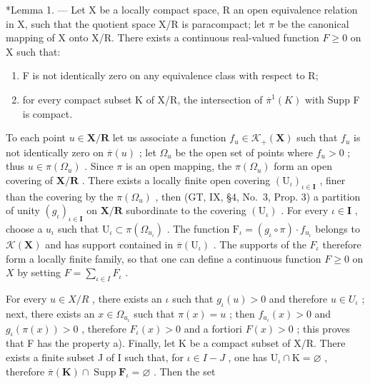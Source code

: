 \appendixheading

*Lemma 1. --- Let X be a locally compact space, R an open equivalence relation in X, such that the quotient space X/R is paracompact; let \(\pi\) be the canonical mapping of X onto X/R. There exists a continuous real-valued function \(F \geqslant 0\) on X such that:

\begin{enumerate}
\def\labelenumi{\alph{enumi})}
\item
  F is not identically zero on any equivalence class with respect to R;
\item
  for every compact subset K of X/R, the intersection of \(\overline{\pi}^{1}(K)\) with Supp F is compact.
\end{enumerate}

To each point \(u \in \mathbf{X} / \mathbf{R}\) let us associate a function \(f_{u} \in \mathcal{K}_{+}(\mathbf{X})\) such that \(f_{u}\) is not identically zero on \(\overline{\pi}(u)\) ; let \(\Omega_{u}\) be the open set of points where \(f_{u} > 0\) ; thus \(u \in \pi(\Omega_{u})\) . Since \(\pi\) is an open mapping, the \(\pi(\Omega_{u})\) form an open covering of \(\mathbf{X} / \mathbf{R}\) . There exists a locally finite open covering \((\mathrm{U}_{\iota})_{\iota \in \mathbf{I}}\) , finer than the covering by the \(\pi(\Omega_{u})\) , then (GT, IX, §4, No.~3, Prop. 3) a partition of unity \((g_{\iota})_{\iota \in \mathbf{I}}\) on \(\mathbf{X} / \mathbf{R}\) subordinate to the covering \((\mathrm{U}_{\iota})\) . For every \(\iota \in \mathbf{I}\) , choose a \(u_{\iota}\) such that \(\mathrm{U}_{\iota} \subset \pi(\Omega_{u_{\iota}})\) . The function \(\mathrm{F}_{\iota} = (g_{\iota} \circ \pi) \cdot f_{u_{\iota}}\) belongs to \(\mathcal{K}(\mathbf{X})\) and has support contained in \(\overline{\pi}(\mathrm{U}_{\iota})\) . The supports of the \(F_{\iota}\) therefore form a locally finite family, so that one can define a continuous function \(F \geqslant 0\) on \(X\) by setting \(F = \sum_{\iota \in I} F_{\iota}\) .

For every \(u \in X/R\) , there exists an \(\iota\) such that \(g_{\iota}(u) > 0\) and therefore \(u \in U_{\iota}\) ; next, there exists an \(x \in \Omega_{u_{\iota}}\) such that \(\pi(x) = u\) ; then \(f_{u_{\iota}}(x) > 0\) and \(g_{\iota}(\pi(x)) > 0\) , therefore \(F_{\iota}(x) > 0\) and a fortiori \(F(x) > 0\) ; this proves that F has the property a). Finally, let K be a compact subset of X/R. There exists a finite subset J of I such that, for \(\iota \in I - J\) , one has \(\mathrm{U}_{\iota}\cap \mathrm{K} = \varnothing\) , therefore \(\overline{\pi} (\mathbf{K})\cap \operatorname {Supp}\mathbf{F}_{\iota} = \varnothing\) . Then the set

